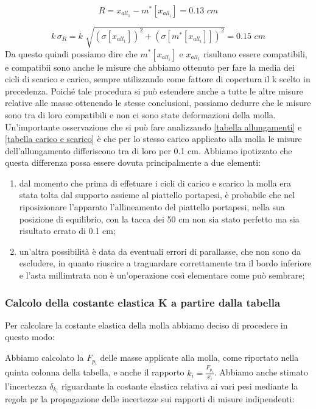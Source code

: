 \begin{equation*}
	R = x_{all_1} - m^*[x_{all_i}] = 0.13 \,\,cm
\end{equation*}

\begin{equation*}
	k\, \sigma_{R} = k\,\, \sqrt{(\sigma[x_{all_1}])^2 + (\sigma[m^*[x_{all_i}]])^2} = 0.15 \,\,cm
\end{equation*}
%
Da questo quindi possiamo dire che $m^*[x_{all_i}]$ e $x_{all_1}$ risultano essere compatibili, e compatibii sono anche le misure che abbiamo ottenuto per fare la media dei cicli di scarico e carico, sempre utilizzando come fattore di copertura il k scelto in precedenza.
Poiché tale procedura si può estendere anche a tutte le altre misure relative alle masse ottenendo le stesse conclusioni, possiamo dedurre che le misure sono tra di loro compatibili e non ci sono state deformazioni della molla.
Un'importante osservazione che si può fare analizzando \ref{tabella allungamenti} e \ref{tabella carico e scarico} è che per lo stesso carico applicato alla molla le misure dell'allungamento differiscono tra di loro per 0.1 cm. Abbiamo ipotizzato che questa differenza possa essere dovuta principalmente a due elementi:

\begin{enumerate}
	\item{dal momento che prima di effetuare i cicli di carico e scarico la molla era stata tolta dal supporto assieme al piattello portapesi, è probabile che nel riposizionare l'apparato l'allineamento del piattello portapesi, nella sua posizione di equilibrio, con la tacca dei 50 cm non sia stato perfetto ma sia risultato errato di 0.1 cm;}
	\item{un'altra possibilità è data da eventuali errori di parallasse, che non sono da escludere, in quanto riuscire a traguardare correttamente tra il bordo inferiore e l'asta millimtrata non è un'operazione così elementare come può sembrare;}
\end{enumerate}

\subsubsection{Calcolo della costante elastica K a partire dalla tabella}
Per calcolare la costante elastica della molla abbiamo deciso di procedere in questo modo:

Abbiamo calcolato la $F_{p_{i}}$ delle masse applicate alla molla, come riportato nella quinta colonna della tabella, e anche il rapporto $k_{i} = \frac{F_{p_{i}}}{x_{i}}$. Abbiamo anche stimato l'incertezza $\delta_{k_{i}}$ riguardante la costante elastica relativa ai vari pesi mediante la regola pr la propagazione delle incertezze sui rapporti di misure indipendenti:

